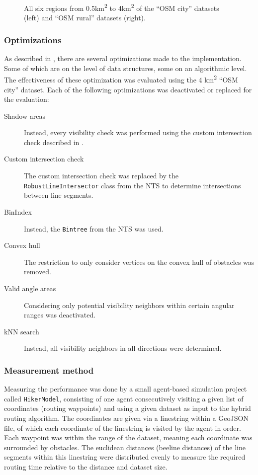 \begin{figure}[h!]
\begin{minipage}[t]{.38\textwidth}
\begin{figcenter}
					\end{figcenter}
				\end{minipage}
				\caption[Areas of the \enquote{OSM city} and \enquote{OSM rural} datasets.]{All six regions from 0.5km\textsuperscript{2} to 4km\textsuperscript{2} of the \enquote{OSM city} datasets (left) and \enquote{OSM rural} datasets (right).}
			\end{figure}
		
		\subsubsection{Optimizations}
		
			As described in , there are several optimizations made to the implementation.
			Some of which are on the level of data structures, some on an algorithmic level.
			The effectiveness of these optimization was evaluated using the 4 km\textsuperscript{2} \enquote{OSM city} dataset.
			Each of the following optimizations was deactivated or replaced for the evaluation:

			\begin{description}
				\item[Shadow areas] Instead, every visibility check was performed using the custom intersection check described in .
				\item[Custom intersection check] The custom intersection check was replaced by the \texttt{RobustLineIntersector} class from the NTS to determine intersections between line segments.
				\item[BinIndex] Instead, the \texttt{Bintree} from the NTS was used.
				\item[Convex hull] The restriction to only consider vertices on the convex hull of obstacles was removed.
				\item[Valid angle areas] Considering only potential visibility neighbors within certain angular ranges was deactivated.
				\item[kNN search] Instead, all visibility neighbors in all directions were determined.
			\end{description}		
			
		\subsubsection{Measurement method}
		
			Measuring the performance was done by a small agent-based simulation project called \texttt{HikerModel}, consisting of one agent consecutively visiting a given list of coordinates (routing waypoints) and using a given dataset as input to the hybrid routing algorithm.
			The coordinates are given via a linestring within a GeoJSON file, of which each coordinate of the linestring is visited by the agent in order.
			Each waypoint was within the range of the dataset, meaning each coordinate was surrounded by obstacles.
			The euclidean distances (beeline distances) of the line segments within this linestring were distributed evenly to measure the required routing time relative to the distance and dataset size.
			
